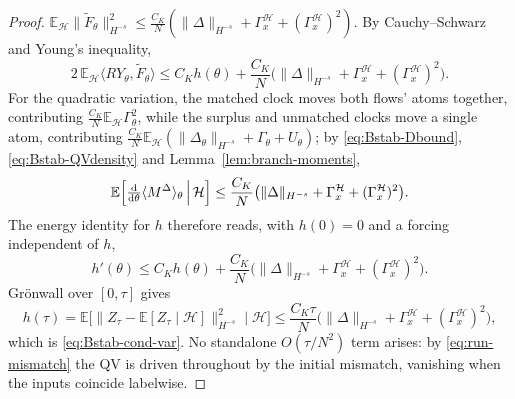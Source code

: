 \documentclass[a4paper,fleqn]{cas-sc}
\theoremstyle{definition}
\theoremstyle{remark}
\begin{document}
\begin{proof}
$\mathbb E_{\mathcal H}\|\widetilde F_\theta\|_{H^{-s}}^2\le\frac{C_K}N(\|\Delta\|_{H^{-s}}+\Gamma_x^{\mathcal H}+(\Gamma_x^{\mathcal H})^2)$.
By Cauchy--Schwarz and Young's inequality,
\[
2\,\mathbb E_{\mathcal H}\langle RY_\theta,\widetilde F_\theta\rangle
\le C_K h(\theta)
+\frac{C_K}{N}\bigl(\|\Delta\|_{H^{-s}}+\Gamma_x^{\mathcal H}+(\Gamma_x^{\mathcal H})^2\bigr).
\] For the quadratic
variation, the matched clock moves both flows' atoms together, contributing
$\frac{C_K}N\mathbb E_{\mathcal H}\Gamma_\theta^2$, while the surplus and unmatched clocks move a
single atom, contributing $\frac{C_K}N\mathbb E_{\mathcal H}(\|\Delta_\theta\|_{H^{-s}}+\Gamma_\theta+U_\theta)$;
by \eqref{eq:Bstab-Dbound}, \eqref{eq:Bstab-QVdensity} and Lemma~\ref{lem:branch-moments},
\[
\mathbb E\Bigl[\tfrac{\mathrm d}{\mathrm d\theta}\langle M^\Delta\rangle_\theta\,\Big|\,\mathcal H\Bigr]
\le\frac{C_K}{N}\bigl(\|\Delta\|_{H^{-s}}+\Gamma_x^{\mathcal H}+(\Gamma_x^{\mathcal H})^2\bigr).
\]
The energy identity for $h$ therefore reads, with $h(0)=0$ and a forcing independent of $h$,
\[
h'(\theta)\le C_Kh(\theta)+\frac{C_K}{N}\bigl(\|\Delta\|_{H^{-s}}+\Gamma_x^{\mathcal H}+(\Gamma_x^{\mathcal H})^2\bigr).
\]
Gr\"onwall over $[0,\tau]$ gives
\[
h(\tau)=\mathbb E\bigl[\|Z_\tau-\mathbb E[Z_\tau\mid\mathcal H]\|_{H^{-s}}^2\mid\mathcal H\bigr]
\le\frac{C_K\tau}{N}\bigl(\|\Delta\|_{H^{-s}}+\Gamma_x^{\mathcal H}+(\Gamma_x^{\mathcal H})^2\bigr),
\]
which is \eqref{eq:Bstab-cond-var}. No standalone $O(\tau/N^2)$ term arises: by
\eqref{eq:run-mismatch} the QV is driven throughout by the initial mismatch, vanishing
when the inputs coincide labelwise.


\end{proof}
\end{document}
